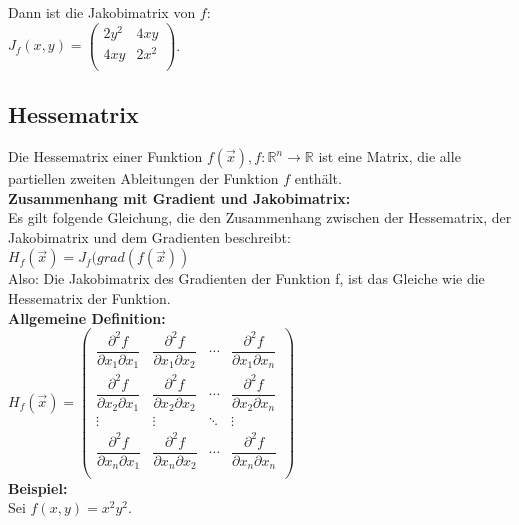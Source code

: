 \documentclass[11pt,final]{scrreprt}
\newcommand{\R} {\mathbb R}
\begin{document}
Dann ist die Jakobimatrix von $f$:\\
$J_f(x, y) = \left(\begin{matrix}
2y^2 & 4xy \\
4xy & 2x^2 \\
\end{matrix}\right)$.\\

\subsection{Hessematrix}
Die Hessematrix einer Funktion $f(\overrightarrow{x}), f:\R^n \rightarrow \R$ ist eine Matrix, die alle partiellen zweiten Ableitungen der Funktion $f$ enthält.\\

\textbf{Zusammenhang mit Gradient und Jakobimatrix:}\\
Es gilt folgende Gleichung, die den Zusammenhang zwischen der Hessematrix, der Jakobimatrix und dem Gradienten beschreibt:\\

$ H_f(\overrightarrow{x}) = J_f(grad(f(\overrightarrow{x})) $\\

Also: Die Jakobimatrix des Gradienten der Funktion f, ist das Gleiche wie die Hessematrix der Funktion.\\

\textbf{Allgemeine Definition:}\\
$H_f(\overrightarrow{x}) = \left(\begin{matrix}
\dfrac{\partial^2 f}{\partial x_1 \partial x_1} & \dfrac{\partial^2 f}{\partial x_1 \partial x_2} &\cdots & \dfrac{\partial^2 f}{\partial x_1 \partial x_n} \\
\dfrac{\partial^2 f}{\partial x_2 \partial x_1} & \dfrac{\partial^2 f}{\partial x_2 \partial x_2} &\cdots & \dfrac{\partial^2 f}{\partial x_2 \partial x_n} \\
\vdots & \vdots & \ddots &\vdots\\
\dfrac{\partial^2 f}{\partial x_n \partial x_1} & \dfrac{\partial^2 f}{\partial x_n\partial x_2} & \cdots & \dfrac{\partial^2 f}{\partial x_n \partial x_n} \\
\end{matrix}\right)$\\

\textbf{Beispiel:}\\

Sei $f(x, y) = x^2y^2 $.\\
\end{document}
